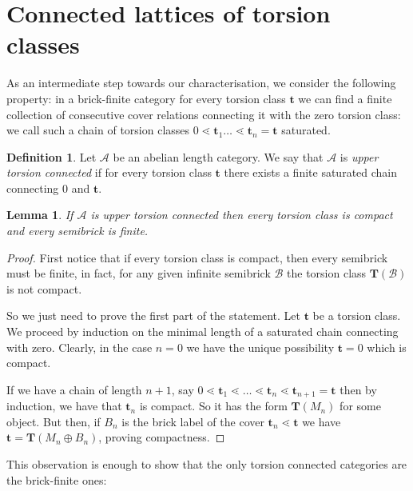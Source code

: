 \documentclass[11pt]{amsart}
\newtheorem{lemma}[theorem]{Lemma}
\theoremstyle{definition}
\newtheorem{definition}[theorem]{Definition}
\newcommand{\A}{\mathcal A}
\newcommand{\tGen}[1]{\mathbf{T}(#1)}
\begin{document}
\section{Connected lattices of torsion classes}

As an intermediate step towards our characterisation, we consider the following property: in a brick-finite category for every torsion class \( \mathbf{t} \) we can find a finite collection of consecutive cover relations connecting it with the zero torsion class: we call such a chain of torsion classes \( 0 \lessdot \mathbf{t}_1 \dots \lessdot  \mathbf{t}_n = \mathbf{t} \) saturated.

\begin{definition}
Let \( \A \) be an abelian length category. We say that \( \A \) is \emph{upper torsion connected} if for every torsion class \( \mathbf{t} \) there exists a finite saturated chain connecting \( 0 \) and \( \mathbf{t} \).
\end{definition}

\begin{lemma}
\label{lem:semibrickFin}
If \( \A \) is upper torsion connected then every torsion class is compact and every semibrick is finite.
\end{lemma}

\begin{proof}
First notice that if every torsion class is compact, then every semibrick must be finite, in fact, for any given infinite semibrick \( \mathcal{B} \) the torsion class \( \tGen{\mathcal{B}} \) is not compact. 

So we just need to prove the first part of the statement. Let \( \mathbf{t} \) be a torsion class. We proceed by induction on the minimal length of a saturated chain connecting with zero. Clearly, in the case \( n = 0 \) we have the unique possibility \( \mathbf{t} = 0 \) which is compact. 

If we have a chain of length \( n + 1 \), say \( 0 \lessdot \mathbf{t}_1 \lessdot \dots \lessdot \mathbf{t}_n \lessdot \mathbf{t}_{n + 1} = \mathbf{t} \) then by induction, we have that \( \mathbf{t}_n \) is compact. So it has the form \( \tGen{M_n} \) for some object. But then, if \( B_n \) is the brick label of the cover \( \mathbf{t}_n \lessdot \mathbf{t} \) we have \( \mathbf{t} = \tGen{M_n \oplus B_n} \), proving compactness. 
\end{proof}

This observation is enough to show that the only torsion connected categories are the brick-finite ones:
\end{document}
